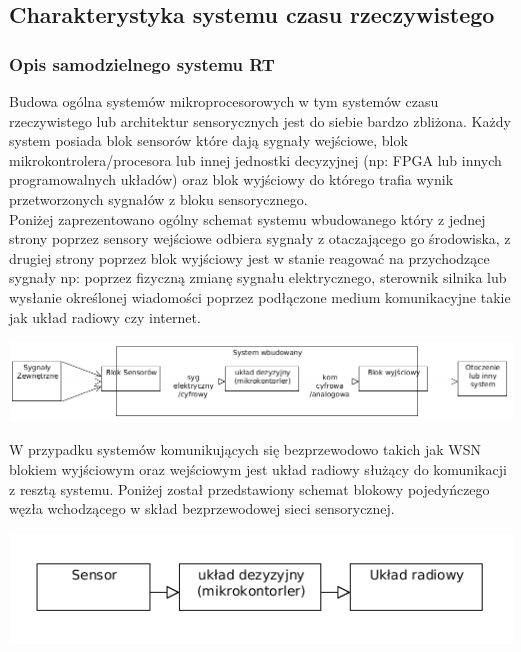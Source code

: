 \subsection{Charakterystyka systemu czasu rzeczywistego}

\newtheorem{master_thesis}{Postawiony problem}[section]

\subsubsection{Opis samodzielnego systemu RT}

\par 
\tab Budowa ogólna systemów mikroprocesorowych w tym systemów czasu rzeczywistego lub architektur sensorycznych jest do siebie bardzo zbliżona. Każdy system posiada blok sensorów które dają sygnały wejściowe, blok mikrokontrolera/procesora lub innej jednostki decyzyjnej (np: FPGA lub innych programowalnych układów) oraz blok wyjściowy do którego trafia wynik przetworzonych sygnałów z bloku sensorycznego. \\
Poniżej zaprezentowano ogólny schemat systemu wbudowanego który z jednej strony poprzez sensory wejściowe odbiera sygnały z otaczającego go środowiska, z drugiej strony poprzez blok wyjściowy jest w stanie reagować na przychodzące sygnały np: poprzez fizyczną zmianę sygnału elektrycznego, sterownik silnika lub wysłanie określonej wiadomości poprzez podłączone medium komunikacyjne takie jak układ radiowy czy internet. \\

 \centerline{\includegraphics[scale=0.40]{./img/target_system/embedded_system_general.png}} 

\par
\tab
W przypadku systemów komunikujących się bezprzewodowo takich jak WSN blokiem wyjściowym oraz wejściowym jest układ radiowy służący do komunikacji z resztą systemu. Poniżej został przedstawiony schemat blokowy pojedyńczego węzła wchodzącego w skład bezprzewodowej sieci sensorycznej. \\

 \centerline{\includegraphics[scale=0.40]{./img/target_system/Uklad_badany.png}} 

